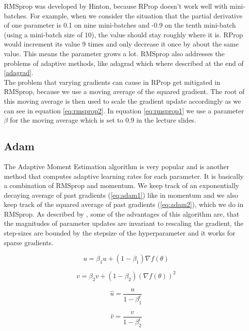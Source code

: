 \documentclass[aodsor,preprint]{imsart}
\numberwithin{equation}{section}
\theoremstyle{plain}
\begin{document}
RMSprop was developed by Hinton, because RProp doesn't work well with mini-batches. For example, when we consider the situation that the partial derivative of one parameter is 0.1 on nine mini-batches and -0.9 on the tenth mini-batch (using a mini-batch size of 10), the value should stay roughly where it is. RProp would increment its value 9 times and only decrease it once by about the same value. This means the parameter grows a lot. RMSprop also addresses the problems of adaptive methods, like adagrad which where described at the end of \ref{adagrad}. \\
The problem that varying gradients can cause in RProp get mitigated in RMSprop, because we use a moving average of the squared gradient. The root of this moving average is then used to scale the gradient update accordingly as we can see in equation \ref{eq:rmsprop2}. In equation \ref{eq:rmsprop1} we use a parameter $\beta$ for the moving average which is set to 0.9 in the lecture slides.

\subsection{Adam}
The Adaptive Moment Estimation algorithm is very popular and is another method that computes adaptive learning rates for each parameter. It is basically a combination of RMSprop and momentum. We keep track of an exponentially decaying average of past gradients (\ref{eq:adam1}) like in momentum and we also keep track of the squared average of past gradients (\ref{eq:adam2}), which we do in RMSprop. As described by \cite{adam}, some of the advantages of this algorithm are, that the magnitudes of parameter updates are invariant to rescaling the gradient, the step-sizes are bounded by the stepsize of the hyperparameter and it works for sparse gradients.

\begin{equation} \label{eq:adam1}
u = \beta_{1} u + (1-\beta_{1}) \nabla f(\theta)
\end{equation} 

\begin{equation} \label{eq:adam2}
v = \beta_{2} v + (1-\beta_{2}) \left( \nabla f(\theta)\right)^2
\end{equation}

\begin{equation} \label{eq:adam3}
\hat{u} = \frac{u}{1-\beta_{1}^t}
\end{equation} 

\begin{equation} \label{eq:adam4}
\hat{v} = \frac{v}{1-\beta_{2}^t}
\end{equation}
\end{document}
